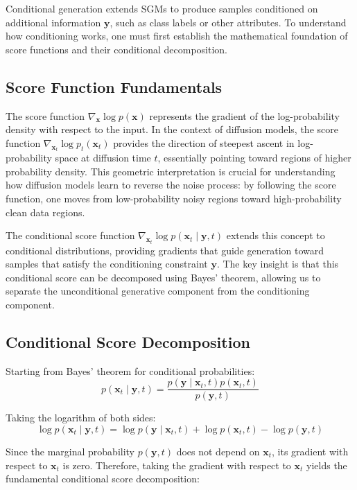 \documentclass[licencjacka,en]{pracamgr}
\begin{document}
Conditional generation extends SGMs to produce samples conditioned on additional information $\mathbf{y}$, such as class labels or other attributes. To understand how conditioning works, one must first establish the mathematical foundation of score functions and their conditional decomposition.

\subsection{Score Function Fundamentals}

The score function $\nabla_{\mathbf{x}} \log p(\mathbf{x})$ represents the gradient of the log-probability density with respect to the input. In the context of diffusion models, the score function $\nabla_{\mathbf{x}_t} \log p_t(\mathbf{x}_t)$ provides the direction of steepest ascent in log-probability space at diffusion time $t$, essentially pointing toward regions of higher probability density. This geometric interpretation is crucial for understanding how diffusion models learn to reverse the noise process: by following the score function, one moves from low-probability noisy regions toward high-probability clean data regions.

The conditional score function $\nabla_{\mathbf{x}_t} \log p(\mathbf{x}_t \mid \mathbf{y}, t)$ extends this concept to conditional distributions, providing gradients that guide generation toward samples that satisfy the conditioning constraint $\mathbf{y}$. The key insight is that this conditional score can be decomposed using Bayes' theorem, allowing us to separate the unconditional generative component from the conditioning component.

\subsection{Conditional Score Decomposition}

Starting from Bayes' theorem for conditional probabilities:
$$p(\mathbf{x}_t \mid \mathbf{y}, t) = \frac{p(\mathbf{y} \mid \mathbf{x}_t, t) p(\mathbf{x}_t, t)}{p(\mathbf{y}, t)}$$

Taking the logarithm of both sides:
$$\log p(\mathbf{x}_t \mid \mathbf{y}, t) = \log p(\mathbf{y} \mid \mathbf{x}_t, t) + \log p(\mathbf{x}_t, t) - \log p(\mathbf{y}, t)$$

Since the marginal probability $p(\mathbf{y}, t)$ does not depend on $\mathbf{x}_t$, its gradient with respect to $\mathbf{x}_t$ is zero. Therefore, taking the gradient with respect to $\mathbf{x}_t$ yields the fundamental conditional score decomposition:
\end{document}

